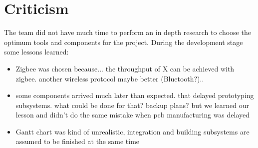 \section{Criticism}
The team did not have much time to perform an in depth research to choose the optimum tools and components for the project. During the development stage some lessons learned:
\TODO{}
\begin{itemize}
\item Zigbee was chosen because... the throughput of X can be achieved with zigbee. another wireless protocol maybe better (Bluetooth?)..
\item some components arrived much later than expected. that delayed prototyping subsystems. what could be done for that? backup plans? but we learned our lesson and didn’t do the same mistake when pcb manufacturing was delayed
\item Gantt chart was kind of unrealistic, integration and building subsystems are assumed to be finished at the same time
\end{itemize}
